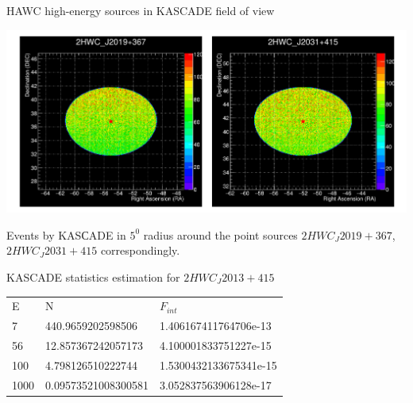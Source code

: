 \begin{frame}{HAWC high-energy sources in KASCADE field of view}
 \begin{center}
    \includegraphics[width=1\textwidth]{pics/2HWCsources.pdf}
    
 Events by KASСADE in $5^0$ radius around the point sources $2HWC_J2019+367$, $2HWC_J2031+415$ correspondingly.

\end{center}
\end{frame}


\begin{frame}{KASCADE statistics estimation for $2HWC_J2013+415$}

\begin{table}[]
\begin{tabular}{lll}
E &       N &      $F_{int}$  \\
7 & 440.9659202598506 & 1.406167411764706e-13\\
56 & 12.857367242057173 & 4.100001833751227e-15\\
100 & 4.798126510222744 & 1.5300432133675341e-15\\
1000 & 0.09573521008300581 & 3.052837563906128e-17\\
\end{tabular}
\end{table}

\end{frame}
